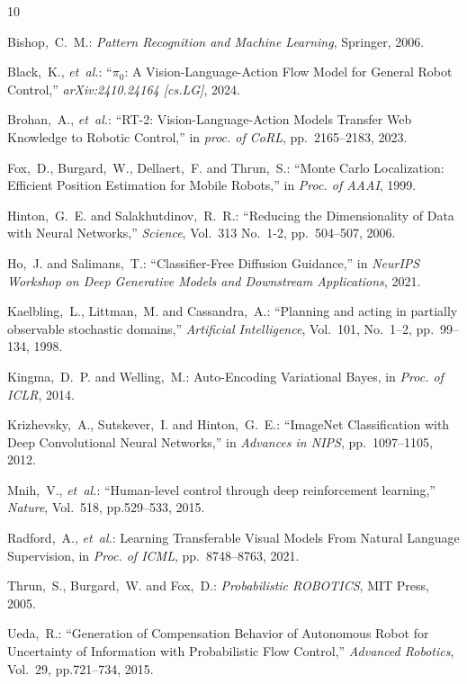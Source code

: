 \documentclass[twocolumn]{jarticle} %
\begin{document}
\newcommand{\noop}[1]{}
\begin{thebibliography}{10}

Bishop,~C.~M.: {\em {Pattern Recognition and Machine Learning}}, Springer, 2006.

Black,~K., {\it et~al.}: ``{$\pi_0$: A Vision-Language-Action Flow Model for General
  Robot Control},'' {\em arXiv:2410.24164 [cs.LG]},  2024.

Brohan,~A., {\it et~al.}: ``{RT-2: Vision-Language-Action Models Transfer Web Knowledge
  to Robotic Control},'' in {\em proc. of CoRL}, pp.~2165--2183, 2023.

Fox,~D., Burgard,~W., Dellaert,~F. and Thrun,~S.: ``{Monte Carlo Localization:
  Efficient Position Estimation for Mobile Robots},'' in {\em Proc. of AAAI},
  1999.

Hinton,~G.~E. and Salakhutdinov,~R.~R.: ``{Reducing the Dimensionality of Data
  with Neural Networks},'' {\em Science}, Vol.~313 No.~1-2, pp.~504--507, 2006.

Ho,~J. and Salimans,~T.: ``{Classifier-Free Diffusion Guidance},'' in {\em NeurIPS
  Workshop on Deep Generative Models and Downstream Applications}, 2021.

Kaelbling,~L., Littman,~M. and Cassandra,~A.: ``{Planning and acting in partially
  observable stochastic domains},'' {\em Artificial Intelligence}, Vol.~101, No.~1--2, pp.~99--134, 1998.

Kingma,~D.~P. and Welling,~M.: {Auto-Encoding Variational Bayes}, in {\em Proc. of ICLR}, 2014.

Krizhevsky,~A., Sutskever,~I. and Hinton,~G.~E.: ``{ImageNet Classification with Deep Convolutional Neural Networks},'' in {\em Advances in NIPS}, pp.~1097--1105, 2012.

Mnih,~V., {\it et~al.}: ``{Human-level
  control through deep reinforcement learning},'' {\em Nature}, Vol.~518,
  pp.529--533, 2015.

Radford,~A., {\it et~al.}: Learning Transferable Visual Models From Natural Language
  Supervision, in {\em Proc. of ICML}, pp.~8748--8763, 2021.

Thrun,~S., Burgard,~W. and Fox,~D.: {\em {Probabilistic ROBOTICS}}, MIT Press,
  2005.

Ueda,~R.: ``{Generation of Compensation Behavior of Autonomous Robot for
  Uncertainty of Information with Probabilistic Flow Control},'' {\em Advanced
  Robotics}, Vol.~29, pp.721--734, 2015.


\end{thebibliography}
\end{document}
